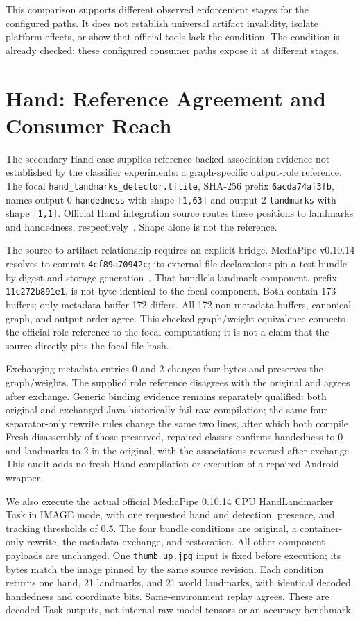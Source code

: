 \documentclass[10pt,twocolumn,letterpaper]{article}
\newcommand{\code}[1]{\texttt{#1}}
\begin{document}
This comparison supports different observed enforcement stages for the configured paths. It does not establish universal artifact invalidity, isolate platform effects, or show that official tools lack the condition. The condition is already checked; these configured consumer paths expose it at different stages.

\section{Hand: Reference Agreement and Consumer Reach}
\label{sec:hand}
The secondary Hand case supplies reference-backed association evidence not established by the classifier experiments: a graph-specific output-role reference. The focal \code{hand\_landmarks\_detector.tflite}, SHA-256 prefix \code{6acda74af3fb}, names output 0 \code{handedness} with shape \code{[1,63]} and output 2 \code{landmarks} with shape \code{[1,1]}. Official Hand integration source routes these positions to landmarks and handedness, respectively~\cite{hand-graph}. Shape alone is not the reference.

The source-to-artifact relationship requires an explicit bridge. MediaPipe v0.10.14 resolves to commit \code{4cf89a70942c}; its external-file declarations pin a test bundle by digest and storage generation~\cite{hand-assets}. That bundle's landmark component, prefix \code{11c272b891e1}, is not byte-identical to the focal component. Both contain 173 buffers; only metadata buffer 172 differs. All 172 non-metadata buffers, canonical graph, and output order agree. This checked graph/weight equivalence connects the official role reference to the focal computation; it is not a claim that the source directly pins the focal file hash.

Exchanging metadata entries 0 and 2 changes four bytes and preserves the graph/weights. The supplied role reference disagrees with the original and agrees after exchange. Generic binding evidence remains separately qualified: both original and exchanged Java historically fail raw compilation; the same four separator-only rewrite rules change the same two lines, after which both compile. Fresh disassembly of those preserved, repaired classes confirms handedness-to-0 and landmarks-to-2 in the original, with the associations reversed after exchange. This audit adds no fresh Hand compilation or execution of a repaired Android wrapper.

We also execute the actual official MediaPipe 0.10.14 CPU HandLandmarker Task in IMAGE mode, with one requested hand and detection, presence, and tracking thresholds of 0.5. The four bundle conditions are original, a container-only rewrite, the metadata exchange, and restoration. All other component payloads are unchanged. One \code{thumb\_up.jpg} input is fixed before execution; its bytes match the image pinned by the same source revision. Each condition returns one hand, 21 landmarks, and 21 world landmarks, with identical decoded handedness and coordinate bits. Same-environment replay agrees. These are decoded Task outputs, not internal raw model tensors or an accuracy benchmark.
\end{document}
